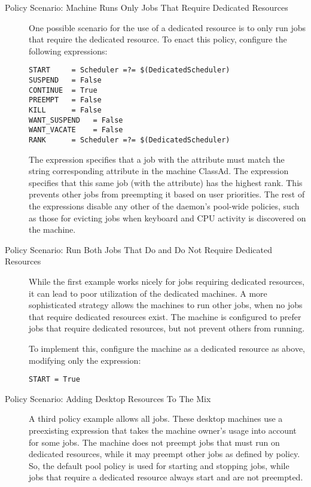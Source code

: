 \begin{description}
\item[Policy Scenario: Machine Runs Only Jobs That Require Dedicated Resources]

One possible scenario for the use of a dedicated resource
is to only run jobs that require the dedicated resource.
To enact this policy, configure the following expressions:

\begin{verbatim}
START     = Scheduler =?= $(DedicatedScheduler)
SUSPEND   = False
CONTINUE  = True
PREEMPT   = False
KILL      = False
WANT_SUSPEND   = False
WANT_VACATE    = False
RANK      = Scheduler =?= $(DedicatedScheduler)
\end{verbatim}

The  expression specifies that a job with the 
attribute must match the string corresponding
 attribute in the machine ClassAd.
The  expression specifies that this same job 
(with the  attribute)
has the highest rank.
This prevents other jobs from preempting it based on user priorities.
The rest of the expressions disable any other of the  daemon's
pool-wide policies, 
such as those for evicting jobs when keyboard and CPU activity is
discovered on the machine.


\item[Policy Scenario: Run Both Jobs That Do and Do Not Require Dedicated Resources]

While the first example works nicely for jobs requiring
dedicated resources,
it can 
lead to poor utilization of the dedicated machines.  
A more sophisticated strategy allows 
the machines to run other jobs, when no jobs that
require dedicated resources exist.
The machine is
configured to prefer jobs that require dedicated resources,
but not prevent others from running.

To implement this,
configure the machine as a dedicated resource as above,
modifying only the  expression:

\begin{verbatim}
START = True
\end{verbatim}

\item[Policy Scenario: Adding Desktop Resources To The Mix]

A third policy example allows all jobs.
These desktop machines use a preexisting  expression that
takes the machine owner's usage into account for some jobs.
The machine does not preempt jobs that must run on dedicated
resources,
while it may preempt other jobs as defined by policy.
So, the default pool policy is used for starting and
stopping jobs, while jobs that require a dedicated resource always start 
and are not preempted.


\end{description}

